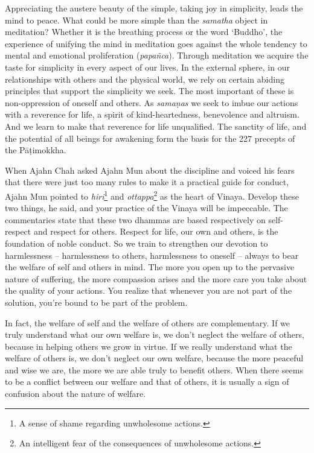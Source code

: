 Appreciating the austere beauty of the simple, taking joy in simplicity, 
leads the mind to peace. What could be more simple than the
\emph{samatha} object in meditation? Whether it is the breathing process
or the word `Buddho', the experience of unifying the mind in meditation
goes against the whole tendency to mental and emotional proliferation
 (\emph{papañca}). Through meditation we acquire the taste for simplicity
in every aspect of our lives. In the external sphere, in our
relationships with others and the physical world, we rely on certain
abiding principles that support the simplicity we seek. The most
important of these is non-oppression of oneself and others. As
\emph{samaṇas} we seek to imbue our actions with a reverence for life, a
spirit of kind-heartedness, benevolence and altruism. And we learn to
make that reverence for life unqualified. The sanctity of life, and the
potential of all beings for awakening form the basis for the 227
precepts of the Pāṭimokkha.

When Ajahn Chah asked Ajahn Mun about the
discipline and voiced his fears that there were just too many rules to
make it a practical guide for conduct, Ajahn Mun pointed to
\emph{hiri}\footnote{A sense of shame regarding unwholesome
actions.} and \emph{ottappa}\footnote{An intelligent fear of
the consequences of unwholesome actions.} as the heart of Vinaya. 
Develop these two things, he said, and your practice of the Vinaya will
be impeccable. The commentaries state that these two dhammas are based
respectively on self-respect and respect for others. Respect for life, 
our own and others, is the foundation of noble conduct. So we train to
strengthen our devotion to harmlessness -- harmlessness to others, 
harmlessness to oneself -- always to bear the welfare of self and
others in mind. The more you open up to the pervasive nature of
suffering, the more compassion arises and the more care you take about
the quality of your actions. You realize that whenever you are not part
of the solution, you're bound to be part of the problem. 

In fact, the welfare of self and the welfare of others are
complementary. If we truly understand what our own welfare is, we don't
neglect the welfare of others, because in helping others we grow in
virtue. If we really understand what the welfare of others is, we don't
neglect our own welfare, because the more peaceful and wise we are, the
more we are able truly to benefit others. When there seems to be a
conflict between our welfare and that of others, it is usually a sign of
confusion about the nature of welfare. 

